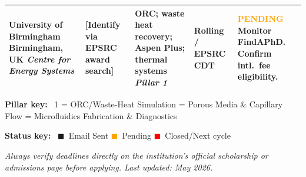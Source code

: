 \documentclass[11pt,a4paper]{article}
\begin{document}
\begin{longtable}{@{} p{3.6cm} p{3.0cm} p{2.8cm} p{1.9cm} p{3.2cm} @{}}
\midrule

\textbf{University of Birmingham}
\newline Birmingham, UK
\newline \textit{Centre for Energy Systems}
&
[Identify via EPSRC award search]
&
ORC; waste heat recovery; Aspen Plus; thermal systems
\newline \textit{Pillar 1}
&
Rolling / EPSRC CDT
&
\textcolor{orange}{\textbf{PENDING}} \newline
Monitor FindAPhD. \newline
Confirm intl.\ fee eligibility. \\

\bottomrule
\end{longtable}

\vspace{6pt}
\noindent
\textbf{Pillar key:} \
1 = ORC/Waste-Heat Simulation  = Porous Media \& Capillary Flow  = Microfluidics Fabrication \& Diagnostics

\vspace{8pt}
\noindent
\textbf{Status key:} \
\textcolor{done}{$\blacksquare$}~Email Sent \quad
\textcolor{orange}{$\blacksquare$}~Pending \quad
\textcolor{red}{$\blacksquare$}~Closed/Next cycle

\vspace{10pt}
\noindent\textit{Always verify deadlines directly on the institution's official
scholarship or admissions page before applying. Last updated: May 2026.}
\end{document}
